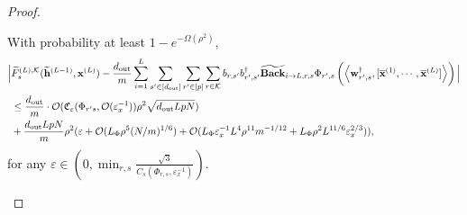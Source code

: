 \begin{claim}
\begin{proof}
				
				\fi    
				
				\begin{claim}\label{claim:difftildefphi_proof}
					With probability at least $1-e^{-\Omega(\rho^2)}$,
					\begin{align*}
						\Big|&\widetilde{F}_{s}^{(L), \mathcal{K}}(\widetilde{\mathbf{h}}^{(L-1)}, \mathbf{x}^{(L)}) - \frac{d_{\mathrm{out}} }{m} \sum_{i=1}^{L}  \sum_{s' \in [d_{\mathrm{out}} ]} \sum_{r' \in [p]} \sum_{r \in \mathcal{K}}  b_{r, s'} b_{r', s'}^{\dagger} \widetilde{\mathbf{Back}}_{i \to L, r, s} \Phi_{r', s} \left(\left\langle \mathbf{w}_{r', s}^{\dagger}, [\overline{\mathbf{x}}^{(1)}, \cdots, \overline{\mathbf{x}}^{(L)}]\right\rangle\right)\Big| \\&\le \frac{d_{\mathrm{out}} }{m} \cdot \mathcal{O}(\mathfrak{C}_{\varepsilon}(\Phi_{r' s}, \mathcal{O}(\varepsilon_x^{-1})) \rho^2 \sqrt{d_{\mathrm{out}} LpN}) \\& + \frac{d_{\mathrm{out}} LpN}{m} \rho^2 (\varepsilon + \mathcal{O}( L_{\Phi}\rho^5 (N/m)^{1/6}) + \mathcal{O}(L_{\Phi}\varepsilon_x^{-1}  L^4 \rho^{11} m^{-1/12} +  L_{\Phi} \rho^2 L^{11/6} \varepsilon_x^{2/3})),
					\end{align*}
					for any $\varepsilon \in (0, \min_{r, s} \frac{\sqrt{3}}{C_s(\Phi_{r, s}, \varepsilon_x^{-1})})$.
				\end{claim}
				

\end{proof}
\end{claim}
